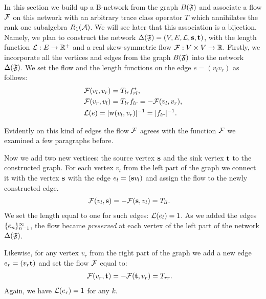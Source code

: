 \documentclass[12pt,oneside,a4paper]{amsart}
\begin{document}
      In this section we build up a B-network from the graph $B(\fsys)$ and associate a flow $\flow$ on this network with 
        an arbitrary trace class operator $T$ which annihilates the rank one subalgebra $R_1(\cal{A})$.
      We will see later that this association is a bijection.
      Namely, we plan to construct the network $\net(\fsys) = (V, E, \len, \source, \sink)$,
        with the length function $\len: E \to \mathbb{R}^{+}$ and a real skew-symmetric flow $\flow: V \times V \to \mathbb{R}$.
      Firstly, we incorporate all the vertices and edges from the graph $B(\fsys)$ into the network $\net(\fsys)$.
      We set the flow and the length functions on the edge $e = (v_l v_r)$ as follows:
      \begin{align*}
        &\flow(v_l, v_r) = T_{lr} f^*_{rl},\\
        &\flow(v_r, v_l) = T_{lr} f_{lr} = -\flow(v_l, v_r),\\
        &\len(e) = \lvert \wt(v_l, v_r) \rvert^{-1} =  \lvert f_{lr}\rvert^{-1}.
      \end{align*}
      \begin{remark}
        Evidently on this kind of edges the flow $\flow$ agrees with the function $\flowsgn$
          we examined a few paragraphs before.
      \end{remark}

      Now we add two new vertices: the source vertex $\source$ and the sink vertex $\sink$ to the constructed graph.
      For each vertex $v_l$ from the left part of the graph we connect it with the vertex $\source$ with the edge $e_l = (\source v_l)$
        and assign the flow to the newly constructed edge.
      \begin{align*}
        &\flow(v_l, \source) = -\flow(\source, v_l) = T_{ll}.
      \end{align*}
      We set the length equal to one for such edges: $\len(e_l) = 1$.
      As we added the edges $\seq{e}$, the flow became \emph{preserved} at each vertex of the left part of the network $\net(\fsys)$.

      Likewise, for any vertex $v_r$ from the right part of the graph we add a new edge $e_r=(v_r \sink)$
        and set the flow $\flow$ equal to:
      \begin{align*}
        &\flow(v_r, \sink) = -\flow(\sink, v_r) =  T_{rr}.
      \end{align*}
      Again, we have $\len(e_r) = 1$ for any $k$.
\end{document}
